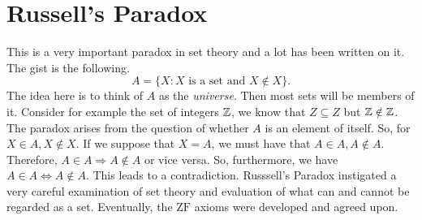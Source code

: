 

\section{Russell's Paradox}
This is a very important paradox in set theory and a lot has been written on it. The gist is the following.
$$
A=\{ X:X \text{ is a set and } X\notin X \}.
$$
The idea here is to think of $A$ as the \emph{universe}. Then most sets will be members of it. Consider for example the set of integers $\mathbb{Z}$, we know that $Z\subseteq Z$ but $\mathbb{Z}\notin\mathbb{Z}$. The paradox arises from the question of whether $A$ is an element of itself. So, for $X\in A, X\notin X$. If we suppose that $X=A$, we must have that $A\in A,A\notin A$. Therefore, $A\in A\Rightarrow A\notin A$ or vice versa. So, furthermore, we have $A\in A\Leftrightarrow A\notin A$. This leads to a contradiction. Russsell's Paradox instigated a very careful examination of set theory and evaluation of what can and cannot be regarded as a set. Eventually, the $\mathrm{ZF}$ axioms were developed and agreed upon. 